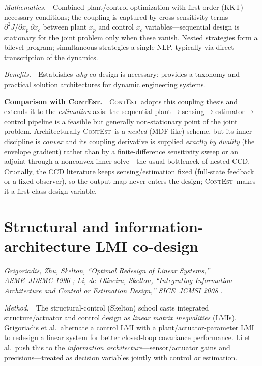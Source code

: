 \documentclass[11pt]{article}
\newcommand{\ContEst}{\textsc{ContEst}}
\newcommand{\Method}{\smallskip\noindent\textit{Method.}~}
\newcommand{\Maths}{\smallskip\noindent\textit{Mathematics.}~}
\newcommand{\Benefits}{\smallskip\noindent\textit{Benefits.}~}
\newcommand{\Versus}{\smallskip\noindent\textbf{Comparison with \ContEst.}~}
\begin{document}
\Maths\ Combined plant/control optimization with first-order (KKT) necessary
conditions; the coupling is captured by cross-sensitivity terms
$\partial^2 J/\partial x_p\,\partial x_c$ between plant $x_p$ and control $x_c$
variables---sequential design is stationary for the joint problem only when these
vanish. Nested strategies form a bilevel program; simultaneous strategies a single
NLP, typically via direct transcription of the dynamics.

\Benefits\ Establishes \emph{why} co-design is necessary; provides a taxonomy and
practical solution architectures for dynamic engineering systems.

\Versus\ \ContEst\ adopts this coupling thesis and extends it to the
\emph{estimation} axis: the sequential plant$\to$sensing$\to$estimator$\to$control
pipeline is a feasible but generally non-stationary point of the joint problem.
Architecturally \ContEst\ is a \emph{nested} (MDF-like) scheme, but its inner
discipline is \emph{convex} and its coupling derivative is supplied \emph{exactly
by duality} (the envelope gradient) rather than by a finite-difference sensitivity
sweep or an adjoint through a nonconvex inner solve---the usual bottleneck of
nested CCD. Crucially, the CCD literature keeps sensing/estimation fixed (full-state
feedback or a fixed observer), so the output map never enters the design; \ContEst\
makes it a first-class design variable.

\section{Structural and information-architecture LMI co-design}\label{sec:lmi}
\noindent\emph{Grigoriadis, Zhu, Skelton, ``Optimal Redesign of Linear Systems,''
ASME~JDSMC 1996 \cite{grigoriadis1998integrate}; Li, de~Oliveira, Skelton,
``Integrating Information Architecture and Control or Estimation Design,'' SICE~JCMSI
2008 \cite{li2008integrating}.}

\Method\ The structural-control (Skelton) school casts integrated
structure/actuator and control design as \emph{linear matrix inequalities} (LMIs).
Grigoriadis et al.\ alternate a control LMI with a plant/actuator-parameter LMI to
redesign a linear system for better closed-loop covariance performance. Li et al.\
push this to the \emph{information architecture}---sensor/actuator gains and
precisions---treated as decision variables jointly with control \emph{or} estimation.
\end{document}
